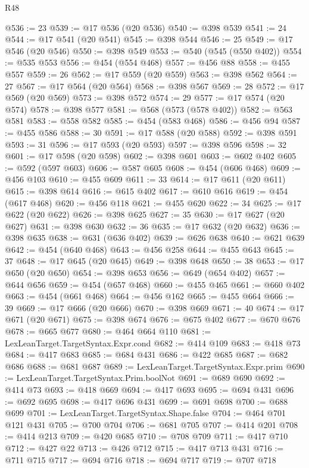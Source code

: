 \begin{lexlean}{R48}
\begin{coremodule}
@536 := 23
@539 := @17 @536 (@20 @536)
@540 := @398 @539
@541 := 24
@544 := @17 @541 (@20 @541)
@545 := @398 @544
@546 := 25
@549 := @17 @546 (@20 @546)
@550 := @398 @549
@553 := @540 (@545 (@550 @402))
@554 := @535 @553
@556 := @454 (@554 @468)
@557 := @456 @88
@558 := @455 @557
@559 := 26
@562 := @17 @559 (@20 @559)
@563 := @398 @562
@564 := 27
@567 := @17 @564 (@20 @564)
@568 := @398 @567
@569 := 28
@572 := @17 @569 (@20 @569)
@573 := @398 @572
@574 := 29
@577 := @17 @574 (@20 @574)
@578 := @398 @577
@581 := @568 (@573 (@578 @402))
@582 := @563 @581
@583 := @558 @582
@585 := @454 (@583 @468)
@586 := @456 @94
@587 := @455 @586
@588 := 30
@591 := @17 @588 (@20 @588)
@592 := @398 @591
@593 := 31
@596 := @17 @593 (@20 @593)
@597 := @398 @596
@598 := 32
@601 := @17 @598 (@20 @598)
@602 := @398 @601
@603 := @602 @402
@605 := @592 (@597 @603)
@606 := @587 @605
@608 := @454 (@606 @468)
@609 := @456 @103
@610 := @455 @609
@611 := 33
@614 := @17 @611 (@20 @611)
@615 := @398 @614
@616 := @615 @402
@617 := @610 @616
@619 := @454 (@617 @468)
@620 := @456 @118
@621 := @455 @620
@622 := 34
@625 := @17 @622 (@20 @622)
@626 := @398 @625
@627 := 35
@630 := @17 @627 (@20 @627)
@631 := @398 @630
@632 := 36
@635 := @17 @632 (@20 @632)
@636 := @398 @635
@638 := @631 (@636 @402)
@639 := @626 @638
@640 := @621 @639
@642 := @454 (@640 @468)
@643 := @456 @258
@644 := @455 @643
@645 := 37
@648 := @17 @645 (@20 @645)
@649 := @398 @648
@650 := 38
@653 := @17 @650 (@20 @650)
@654 := @398 @653
@656 := @649 (@654 @402)
@657 := @644 @656
@659 := @454 (@657 @468)
@660 := @455 @465
@661 := @660 @402
@663 := @454 (@661 @468)
@664 := @456 @162
@665 := @455 @664
@666 := 39
@669 := @17 @666 (@20 @666)
@670 := @398 @669
@671 := 40
@674 := @17 @671 (@20 @671)
@675 := @398 @674
@676 := @675 @402
@677 := @670 @676
@678 := @665 @677
@680 := @464 @664 @110
@681 := LexLeanTarget.TargetSyntax.Expr.cond
@682 := @414 @109
@683 := @418 @73
@684 := @417 @683
@685 := @684 @431
@686 := @422 @685
@687 := @682 @686
@688 := @681 @687
@689 := LexLeanTarget.TargetSyntax.Expr.prim
@690 := LexLeanTarget.TargetSyntax.Prim.boolNot
@691 := @689 @690
@692 := @414 @73
@693 := @418 @669
@694 := @417 @693
@695 := @694 @431
@696 := @692 @695
@698 := @417 @696 @431
@699 := @691 @698
@700 := @688 @699
@701 := LexLeanTarget.TargetSyntax.Shape.false
@704 := @464 @701 @121 @431
@705 := @700 @704
@706 := @681 @705
@707 := @414 @201
@708 := @414 @213
@709 := @420 @685
@710 := @708 @709
@711 := @417 @710
@712 := @427 @22
@713 := @426 @712
@715 := @417 @713 @431
@716 := @711 @715
@717 := @694 @716
@718 := @694 @717
@719 := @707 @718

\end{coremodule}
\end{lexlean}
